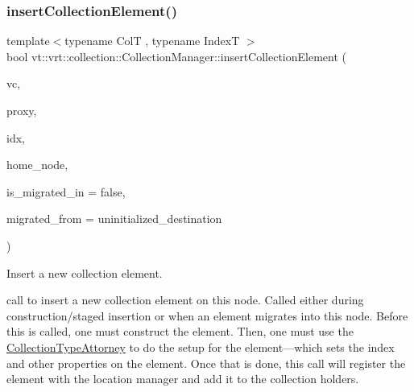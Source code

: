 \subsubsection{\texorpdfstring{insert\+Collection\+Element()}{insertCollectionElement()}}
{\footnotesize\ttfamily template$<$typename ColT , typename IndexT $>$ \\
bool vt\+::vrt\+::collection\+::\+Collection\+Manager\+::insert\+Collection\+Element (\begin{DoxyParamCaption}\item[{\hyperlink{structvt_1_1vrt_1_1collection_1_1_collection_manager_a086cab4af6af4f869fbf8814c3a9a6a4}{Virtual\+Ptr\+Type}$<$ IndexT $>$}]{vc,  }\item[{\hyperlink{namespacevt_a1b417dd5d684f045bb58a0ede70045ac}{Virtual\+Proxy\+Type} const}]{proxy,  }\item[{IndexT const \&}]{idx,  }\item[{\hyperlink{namespacevt_a866da9d0efc19c0a1ce79e9e492f47e2}{Node\+Type} const}]{home\+\_\+node,  }\item[{bool const}]{is\+\_\+migrated\+\_\+in = {\ttfamily false},  }\item[{\hyperlink{namespacevt_a866da9d0efc19c0a1ce79e9e492f47e2}{Node\+Type} const}]{migrated\+\_\+from = {\ttfamily uninitialized\+\_\+destination} }\end{DoxyParamCaption})}



Insert a new collection element. 

call to insert a new collection element on this node. Called either during construction/staged insertion or when an element migrates into this node. Before this is called, one must construct the element. Then, one must use the {\ttfamily \hyperlink{structvt_1_1vrt_1_1collection_1_1_collection_type_attorney}{Collection\+Type\+Attorney}} to do the setup for the element---which sets the index and other properties on the element. Once that is done, this call will register the element with the location manager and add it to the collection holders.


